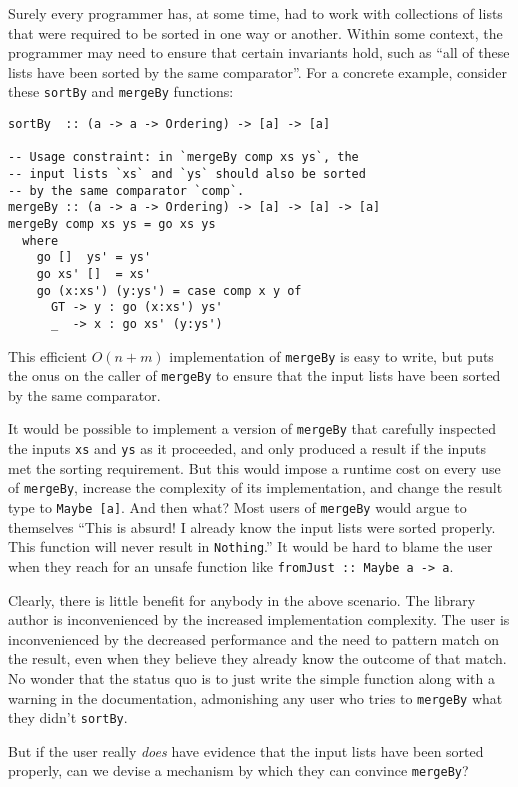 \documentclass[format=sigplan, review=false, screen=true]{acmart}
\begin{document}
Surely every programmer has, at some time, had to work with collections of
lists that were required to be sorted in one way or another. Within some
context, the programmer may need to ensure that certain invariants hold, such
as ``all of these lists have been sorted by the same comparator''. For a concrete
example, consider these \texttt{sortBy} and \texttt{mergeBy} functions:
\begin{verbatim}
sortBy  :: (a -> a -> Ordering) -> [a] -> [a]

-- Usage constraint: in `mergeBy comp xs ys`, the
-- input lists `xs` and `ys` should also be sorted
-- by the same comparator `comp`.
mergeBy :: (a -> a -> Ordering) -> [a] -> [a] -> [a]
mergeBy comp xs ys = go xs ys
  where
    go []  ys' = ys'
    go xs' []  = xs'
    go (x:xs') (y:ys') = case comp x y of
      GT -> y : go (x:xs') ys'
      _  -> x : go xs' (y:ys')
\end{verbatim}
This efficient $O(n+m)$ implementation of \texttt{mergeBy} is easy to write,
but puts the onus on the caller of \texttt{mergeBy} to ensure that the
input lists have been sorted by the same comparator.

It would be possible to implement a version of \texttt{mergeBy} that
carefully inspected the inputs \texttt{xs} and \texttt{ys} as it
proceeded, and only produced a result if the inputs met the sorting
requirement. But this would impose a runtime cost on every use of
\texttt{mergeBy}, increase the complexity of its implementation,
and change the result type to \texttt{Maybe [a]}. And then what?
Most users of \texttt{mergeBy} would argue to themselves ``This is
absurd! I already know the input lists were sorted properly. This
function will never result in \texttt{Nothing}.'' It would be hard
to blame the user when they reach for an  unsafe function like
\texttt{fromJust :: Maybe a -> a}.

Clearly, there is little benefit for anybody in the above scenario. The
library author is inconvenienced by the increased implementation complexity.
The user is inconvenienced by the decreased performance and the need to
pattern match on the result, even when they believe they already know the
outcome of that match. No wonder that the status quo is to just write
the simple function along with a warning in the documentation, admonishing
any user who tries to \texttt{mergeBy} what they didn't \texttt{sortBy}.

But if the user really \emph{does} have evidence that the input lists have
been sorted properly, can we devise a mechanism by which they can convince
\texttt{mergeBy}?
\end{document}
